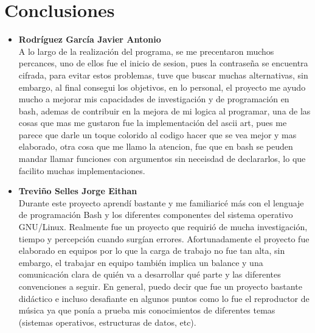 \documentclass[12pt,a4paper]{article}
\begin{document}
    \newpage
\section{Conclusiones}
\justifying
\noindent
\begin{itemize}
    \item \textbf{Rodríguez García Javier Antonio} \\
    A lo largo de la realización del programa, se me precentaron muchos percances, uno de ellos fue el inicio de sesion, pues la contraseña se encuentra cifrada, para evitar estos problemas, tuve que buscar muchas alternativas, sin embargo, al final consegui los objetivos, en lo personal, el proyecto me ayudo mucho a mejorar mis capacidades de investigación y de programación en bash, ademas de contribuir en la mejora de mi logica al programar, una de las cosas que mas me gustaron fue la implementación del ascii art, pues me parece que darle un toque colorido al codigo hacer que se vea mejor y mas elaborado, otra cosa que me llamo la atencion, fue que en bash se peuden mandar llamar funciones con argumentos sin neceisdad de declararlos, lo que facilito muchas implementaciones.   
    \item \textbf{Treviño Selles Jorge Eithan} \\
    Durante este proyecto aprendí bastante y me familiaricé más con el lenguaje de programación Bash y los diferentes componentes del sistema operativo GNU/Linux. Realmente fue un proyecto que requirió de mucha investigación, tiempo y percepción cuando surgían errores. Afortunadamente el proyecto fue elaborado en equipos por lo que la carga de trabajo no fue tan alta, sin embargo, el trabajar en equipo también implica un balance y una comunicación clara de quién va a desarrollar qué parte y las diferentes convenciones a seguir. En general, puedo decir que fue un proyecto bastante didáctico e incluso desafiante en algunos puntos como lo fue el reproductor de música ya que ponía a prueba mis conocimientos de diferentes temas (sistemas operativos, estructuras de datos, etc).
\end{itemize}
\end{document}
